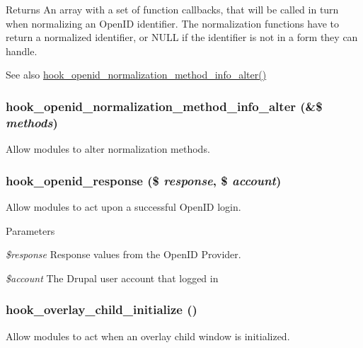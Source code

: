 \begin{DoxyReturn}{Returns}
An array with a set of function callbacks, that will be called in turn when normalizing an OpenID identifier. The normalization functions have to return a normalized identifier, or NULL if the identifier is not in a form they can handle. 
\end{DoxyReturn}
\begin{DoxySeeAlso}{See also}
\hyperlink{group__hooks_ga5600b490e79b0dd8bfff68558df53370}{hook\_\-openid\_\-normalization\_\-method\_\-info\_\-alter()} 
\end{DoxySeeAlso}
\hypertarget{group__hooks_ga5600b490e79b0dd8bfff68558df53370}{
\subsubsection[{hook\_\-openid\_\-normalization\_\-method\_\-info\_\-alter}]{\setlength{\rightskip}{0pt plus 5cm}hook\_\-openid\_\-normalization\_\-method\_\-info\_\-alter (\&\$ {\em methods})}}
\label{group__hooks_ga5600b490e79b0dd8bfff68558df53370}
Allow modules to alter normalization methods. \hypertarget{group__hooks_gabc9e3b65c80d0d90001a8eebec8b5464}{
\subsubsection[{hook\_\-openid\_\-response}]{\setlength{\rightskip}{0pt plus 5cm}hook\_\-openid\_\-response (\$ {\em response}, \/  \$ {\em account})}}
\label{group__hooks_gabc9e3b65c80d0d90001a8eebec8b5464}
Allow modules to act upon a successful OpenID login.


\begin{DoxyParams}{Parameters}
\item[{\em \$response}]Response values from the OpenID Provider. \item[{\em \$account}]The Drupal user account that logged in \end{DoxyParams}
\hypertarget{group__hooks_ga7bf562d101128af70a3eff0a0364342b}{
\subsubsection[{hook\_\-overlay\_\-child\_\-initialize}]{\setlength{\rightskip}{0pt plus 5cm}hook\_\-overlay\_\-child\_\-initialize ()}}
\label{group__hooks_ga7bf562d101128af70a3eff0a0364342b}
Allow modules to act when an overlay child window is initialized.

